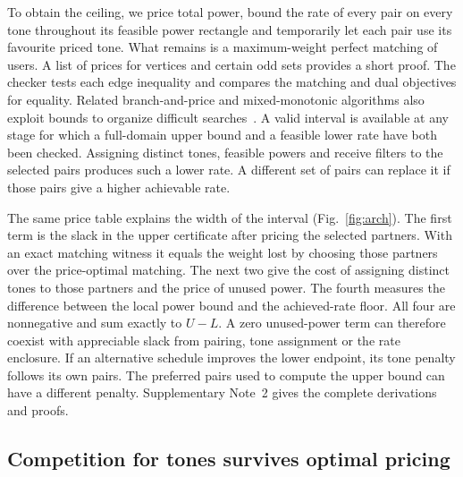 \documentclass[lineno,pdflatex,sn-nature]{sn-jnl}
\begin{document}
To obtain the ceiling, we price total power, bound the rate of every pair on every tone throughout its feasible power rectangle and temporarily let each pair use its favourite priced tone. What remains is a maximum-weight perfect matching of users. A list of prices for vertices and certain odd sets provides a short proof. The checker tests each edge inequality and compares the matching and dual objectives for equality. Related branch-and-price and mixed-monotonic algorithms also exploit bounds to organize difficult searches~\cite{barnhart,matthiesen}. A valid interval is available at any stage for which a full-domain upper bound and a feasible lower rate have both been checked. Assigning distinct tones, feasible powers and receive filters to the selected pairs produces such a lower rate. A different set of pairs can replace it if those pairs give a higher achievable rate.


The same price table explains the width of the interval (Fig.~\ref{fig:arch}). The first term is the slack in the upper certificate after pricing the selected partners. With an exact matching witness it equals the weight lost by choosing those partners over the price-optimal matching. The next two give the cost of assigning distinct tones to those partners and the price of unused power. The fourth measures the difference between the local power bound and the achieved-rate floor. All four are nonnegative and sum exactly to \(U-L\). A zero unused-power term can therefore coexist with appreciable slack from pairing, tone assignment or the rate enclosure. If an alternative schedule improves the lower endpoint, its tone penalty follows its own pairs. The preferred pairs used to compute the upper bound can have a different penalty. Supplementary Note~2 gives the complete derivations and proofs.




\subsection*{Competition for tones survives optimal pricing}
\end{document}
